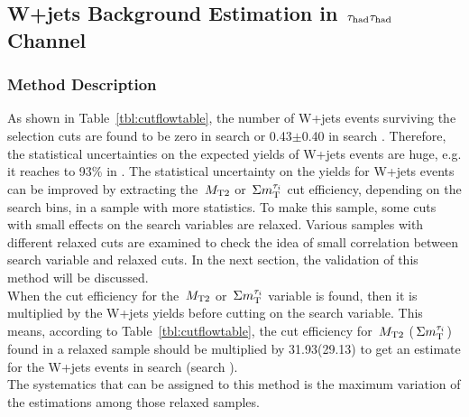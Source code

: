 \subsection{\texorpdfstring{W+jets Background Estimation in $\,\tau_{\rm had}\tau_{\rm had}$ Channel}{W+jets Background Estimation in tau-tau Channel}}
\subsubsection{Method Description}
As shown in Table~\ref{tbl:cutflowtable}, the number of W+jets events surviving 
the selection cuts are found to be zero in search \binone or 0.43$\pm$0.40 in search \bintwo. 
Therefore, the statistical uncertainties on the expected yields of W+jets events
are huge, e.g. it reaches to 93\% in \bintwo. 
 The statistical uncertainty on the yields for W+jets events can be improved by extracting 
the $\,{M_{\rm T2}}$ or $\,\Sigma m_{\rm T}^{\tau_i}$ cut efficiency, depending on the search bins, in a sample with more 
statistics. To make this sample, some cuts with small effects on the search variables are 
relaxed. Various samples with different relaxed cuts are examined to check the idea of small correlation 
between search variable and relaxed cuts. In the next section, the validation of this method will be discussed.\\
When the cut efficiency for the $\,{M_{\rm T2}}$ or $\,\Sigma m_{\rm T}^{\tau_i}$ variable is found, then it is multiplied by the W+jets 
yields before cutting on the search variable. This means, according to Table~\ref{tbl:cutflowtable}, the cut efficiency for 
$\,{M_{\rm T2}}$ ($\,\Sigma m_{\rm T}^{\tau_i}$) found in a relaxed sample should be multiplied by 31.93(29.13) to get an 
estimate for the W+jets events in search \binone (search \bintwo).\\
The systematics that can be assigned to this method is the maximum
variation of the estimations among those relaxed samples.
